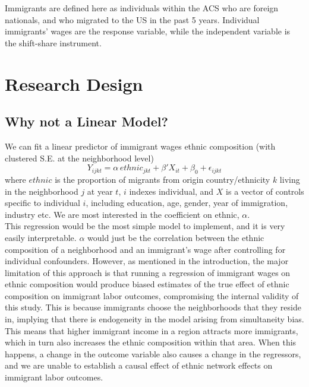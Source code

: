 \documentclass[11pt]{article}
\begin{document}
Immigrants are defined here as individuals within the ACS who are foreign nationals, and who migrated to the US in the past 5 years. Individual immigrants' wages are the response variable, while the independent variable is the shift-share instrument.  

\section{Research Design}

\subsection{Why not a Linear Model?}
We can fit a linear predictor of immigrant wages ethnic composition (with clustered S.E. at the neighborhood level) 
\begin{equation}
    Y_{ijkt} =  \alpha \,ethnic_{jkt} + \beta' X_{it} + \beta_0+\epsilon_{ijkt}
\end{equation}
where $ethnic$ is the proportion of migrants from origin country/ethnicity $k$ living in the neighborhood $j$ at year $t$, $i$ indexes individual, and $X$ is a vector of controls specific to individual $i$, including education, age, gender, year of immigration, industry etc. We are most interested in the coefficient on ethnic, $\alpha$.\\

This regression would be the most simple model to implement, and it is very easily interpretable. $\alpha$ would just be the correlation between the ethnic composition of a neighborhood and an immigrant's wage after controlling for individual confounders. However, as mentioned in the introduction, the major limitation of this approach is that running a regression of immigrant wages on ethnic composition would produce biased estimates of the true effect of ethnic composition on immigrant labor outcomes, compromising the internal validity of this study. This is because immigrants choose the neighborhoods that they reside in, implying that there is endogeneity in the model arising from simultaneity bias. This means that higher immigrant income in a region attracts more immigrants, which in turn also increases the ethnic composition within that area. When this happens, a change in the outcome variable also causes a change in the regressors, and we are unable to establish a causal effect of ethnic network effects on immigrant labor outcomes. 
\end{document}
